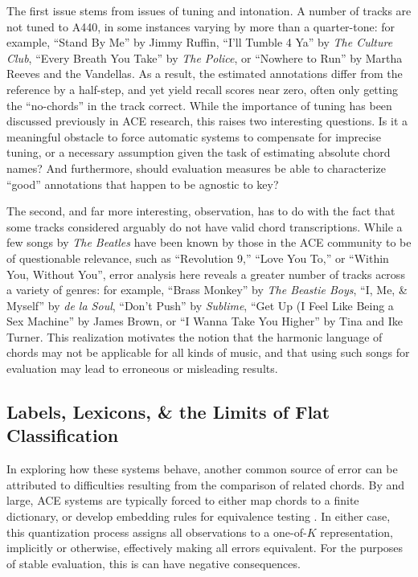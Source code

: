 \documentclass{article}
\begin{document}
The first issue stems from issues of tuning and intonation.
A number of tracks are not tuned to A440, in some instances varying by more than a quarter-tone:
for example, ``Stand By Me'' by Jimmy Ruffin, ``I'll Tumble 4 Ya'' by \emph{The Culture Club}, ``Every Breath You Take'' by \emph{The Police}, or ``Nowhere to Run'' by Martha Reeves and the Vandellas.
As a result, the estimated annotations differ from the reference by a half-step, and yet yield recall scores near zero, often only getting the ``no-chords'' in the track correct.
While the importance of tuning has been discussed previously in ACE research, this raises two interesting questions.
Is it a meaningful obstacle to force automatic systems to compensate for imprecise tuning, or a necessary assumption given the task of estimating absolute chord names?
And furthermore, should evaluation measures be able to characterize ``good'' annotations that happen to be agnostic to key?

The second, and far more interesting, observation, has to do with the fact that some tracks considered arguably do not have valid chord transcriptions.
While a few songs by \emph{The Beatles} have been known by those in the ACE community to be of questionable relevance, such as ``Revolution 9,'' ``Love You To,'' or ``Within You, Without You'', error analysis here reveals a greater number of tracks across a variety of genres:
for example, ``Brass Monkey'' by \emph{The Beastie Boys}, ``I, Me, \& Myself'' by \emph{de la Soul}, ``Don't Push'' by \emph{Sublime}, ``Get Up (I Feel Like Being a Sex Machine'' by James Brown, or ``I Wanna Take You Higher'' by Tina and Ike Turner.
This realization motivates the notion that the harmonic language of chords may not be applicable for all kinds of music, and that using such songs for evaluation may lead to erroneous or misleading results.


\subsection{Labels, Lexicons, \& the Limits of Flat Classification}

In exploring how these systems behave, another common source of error can be attributed to difficulties resulting from the comparison of related chords.
By and large, ACE systems are typically forced to either map chords to a finite dictionary, or develop embedding rules for equivalence testing \cite{Raffel2014Eval}.
In either case, this quantization process assigns all observations to a one-of-$K$ representation, implicitly or otherwise, effectively making all errors equivalent.
For the purposes of stable evaluation, this is can have negative consequences.
\end{document}
